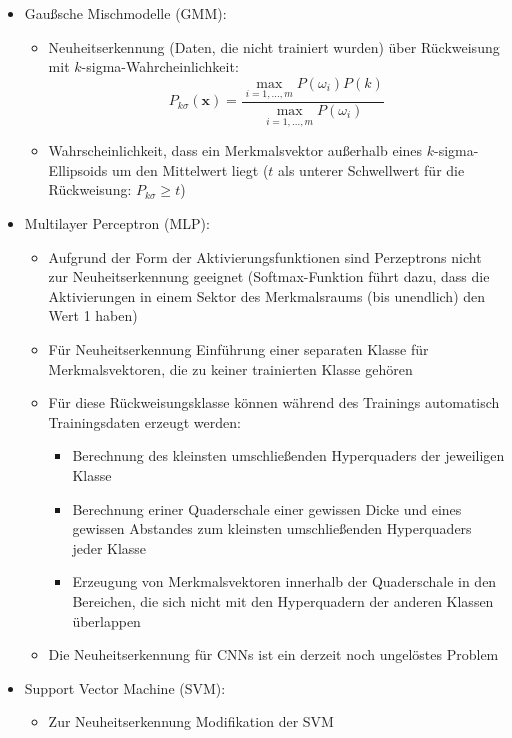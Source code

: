 \documentclass[11pt]{article}
\begin{document}
\begin{itemize}
    \item Gaußsche Mischmodelle (GMM):
        \begin{itemize}
            \item Neuheitserkennung (Daten, die nicht trainiert wurden) über Rückweisung mit $k$-sigma-Wahrcheinlichkeit: $$P_{k\sigma}(\boldsymbol{x}) = \frac{\displaystyle\max_{i=1,\dots,m} P(\omega_i) P(k)}{\displaystyle\max_{i=1,\dots,m} P(\omega_i)}$$
            \item Wahrscheinlichkeit, dass ein Merkmalsvektor außerhalb eines $k$-sigma-Ellipsoids um den Mittelwert liegt ($t$ als unterer Schwellwert für die Rückweisung: $P_{k\sigma} \ge t$)
        \end{itemize}
    \item Multilayer Perceptron (MLP):
        \begin{itemize}
            \item Aufgrund der Form der Aktivierungsfunktionen sind Perzeptrons nicht zur Neuheitserkennung geeignet (Softmax-Funktion führt dazu, dass die Aktivierungen in einem Sektor des Merkmalsraums (bis unendlich) den Wert 1 haben)
            \item Für Neuheitserkennung Einführung einer separaten Klasse für Merkmalsvektoren, die zu keiner trainierten Klasse gehören
            \item Für diese Rückweisungsklasse können während des Trainings automatisch Trainingsdaten erzeugt werden:
                \begin{itemize}
                    \item Berechnung des kleinsten umschließenden Hyperquaders der jeweiligen Klasse
                    \item Berechnung  eriner Quaderschale einer gewissen Dicke und eines gewissen Abstandes zum kleinsten umschließenden Hyperquaders jeder Klasse
                    \item Erzeugung von Merkmalsvektoren innerhalb der Quaderschale in den Bereichen, die sich nicht mit den Hyperquadern der anderen Klassen überlappen
                \end{itemize}
            \item Die Neuheitserkennung für CNNs ist ein derzeit noch ungelöstes Problem
        \end{itemize}
    \item Support Vector Machine (SVM):
        \begin{itemize}
            \item Zur Neuheitserkennung Modifikation der SVM

\end{itemize}
\end{itemize}
\end{document}

